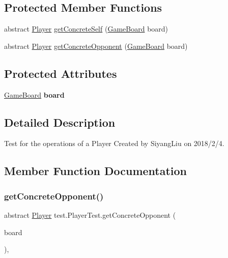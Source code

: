 \subsection*{Protected Member Functions}
\begin{DoxyCompactItemize}
\item 
abstract \mbox{\hyperlink{classplayers_1_1_player}{Player}} \mbox{\hyperlink{classtest_1_1_player_test_a8d7c124dab2eb1050aa1b96b2d6bb2eb}{get\+Concrete\+Self}} (\mbox{\hyperlink{classgameboard_1_1_game_board}{Game\+Board}} board)
\item 
abstract \mbox{\hyperlink{classplayers_1_1_player}{Player}} \mbox{\hyperlink{classtest_1_1_player_test_a8d1acf8417e1fd66430c01d318fee3ac}{get\+Concrete\+Opponent}} (\mbox{\hyperlink{classgameboard_1_1_game_board}{Game\+Board}} board)
\end{DoxyCompactItemize}
\subsection*{Protected Attributes}
\begin{DoxyCompactItemize}
\item 
\mbox{\label{classtest_1_1_player_test_a6264044f63d7fae1dba6c3a1b3d76454}} 
\mbox{\hyperlink{classgameboard_1_1_game_board}{Game\+Board}} {\bfseries board}
\end{DoxyCompactItemize}


\subsection{Detailed Description}
Test for the operations of a Player Created by Siyang\+Liu on 2018/2/4. 

\subsection{Member Function Documentation}
\mbox{\label{classtest_1_1_player_test_a8d1acf8417e1fd66430c01d318fee3ac}} 
\subsubsection{\texorpdfstring{get\+Concrete\+Opponent()}{getConcreteOpponent()}}
{\footnotesize\ttfamily abstract \mbox{\hyperlink{classplayers_1_1_player}{Player}} test.\+Player\+Test.\+get\+Concrete\+Opponent (\begin{DoxyParamCaption}\item[{\mbox{\hyperlink{classgameboard_1_1_game_board}{Game\+Board}}}]{board }\end{DoxyParamCaption})\hspace{0.3cm}{\ttfamily [abstract]}, {\ttfamily [protected]}}

